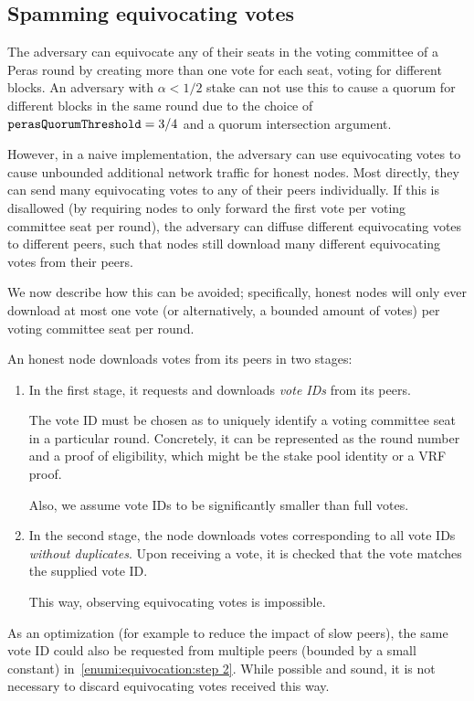 \subsection{Spamming equivocating votes}\label{sec:attack equivocations}

The adversary can equivocate any of their seats in the voting committee of a Peras round by creating more than one vote for each seat, voting for different blocks.
An adversary with $\alpha<1/2$ stake can not use this to cause a quorum for different blocks in the same round due to the choice of $\mathtt{perasQuorumThreshold} = 3/4$ and a quorum intersection argument.

However, in a naive implementation, the adversary can use equivocating votes to cause unbounded additional network traffic for honest nodes.
Most directly, they can send many equivocating votes to any of their peers individually.
If this is disallowed (by requiring nodes to only forward the first vote per voting committee seat per round), the adversary can diffuse different equivocating votes to different peers, such that nodes still download many different equivocating votes from their peers.

We now describe how this can be avoided; specifically, honest nodes will only ever download at most one vote (or alternatively, a bounded amount of votes) per voting committee seat per round.

An honest node downloads votes from its peers in two stages:
\begin{enumerate}
\item\label{enumi:equivocation:step 1}
  In the first stage, it requests and downloads \emph{vote IDs} from its peers.

  The vote ID must be chosen as to uniquely identify a voting committee seat in a particular round.
  Concretely, it can be represented as the round number and a proof of eligibility, which might be the stake pool identity or a VRF proof.

  Also, we assume vote IDs to be significantly smaller than full votes.
\item\label{enumi:equivocation:step 2}
  In the second stage, the node downloads votes corresponding to all vote IDs \emph{without duplicates}.
  Upon receiving a vote, it is checked that the vote matches the supplied vote ID.\@

  This way, observing equivocating votes is impossible.
\end{enumerate}
As an optimization (for example to reduce the impact of slow peers), the same vote ID could also be requested from multiple peers (bounded by a small constant) in~\ref{enumi:equivocation:step 2}.
While possible and sound, it is not necessary to discard equivocating votes received this way.

